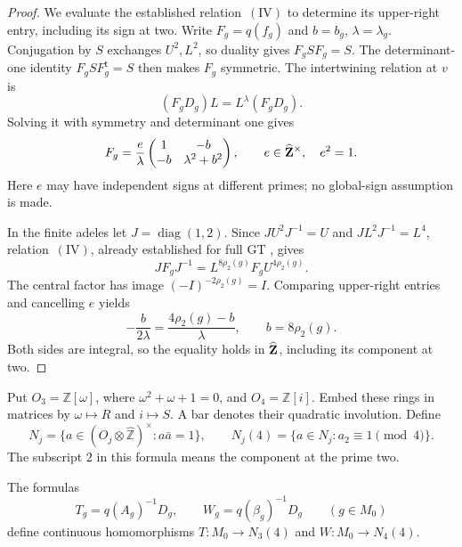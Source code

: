 \begin{proof}
We evaluate the established relation~\((\mathrm{IV})\) to determine
its upper-right entry, including its sign at two. Write
\(F_g=q(f_g)\) and \(b=b_g\), \(\lambda=\lambda_g\).
Conjugation by \(S\) exchanges \(U^2,L^2\), so duality gives
\(F_gSF_g=S\). The determinant-one identity
\(F_gSF_g^{\mathsf t}=S\) then makes \(F_g\) symmetric.
The intertwining relation at \(v\) is
\[
 (F_gD_g)L=L^\lambda(F_gD_g).
\]
Solving it with symmetry and determinant one gives
\[
 F_g=\frac{e}{\lambda}
 \begin{pmatrix}1&-b\\-b&\lambda^2+b^2\end{pmatrix},
 \qquad e\in\widehat{\mathbf Z}^\times,\quad e^2=1.
\]
Here \(e\) may have independent signs at different primes;
no global-sign assumption is made.

In the finite adeles let \(J=\operatorname{diag}(1,2)\).
Since \(JU^2J^{-1}=U\) and \(JL^2J^{-1}=L^4\),
relation~\((\mathrm{IV})\), already established for full GT
\cite[Theorem~1]{H17}, gives
\[
 JF_gJ^{-1}=L^{8\rho_2(g)}F_gU^{4\rho_2(g)}.
\]
The central factor has image
\((-I)^{-2\rho_2(g)}=I\). Comparing upper-right entries and
cancelling \(e\) yields
\[
 -\frac{b}{2\lambda}
       =\frac{4\rho_2(g)-b}{\lambda},
 \qquad b=8\rho_2(g).
\]
Both sides are integral, so the equality holds in
\(\widehat{\mathbf Z}\), including its component at two.
\end{proof}

Put $O_3=\mathbb Z[\omega]$, where $\omega^2+\omega+1=0$,
and $O_4=\mathbb Z[i]$.  Embed these rings in matrices by
$\omega\mapsto R$ and $i\mapsto S$.  A bar denotes their quadratic
involution.  Define
\begin{equation}
 N_j=\{a\in(O_j\otimes\widehat{\mathbb Z})^{\times}:
                                      a\bar a=1\},\qquad
 N_j(4)=\{a\in N_j:a_2\equiv1\pmod4\}.
 \label{eq:adelic-cm-targets}
\end{equation}
The subscript $2$ in this formula means the component at the prime two.

\begin{lemma}\label{lem:adelic-corrected-frames}
The formulas
\begin{equation}
 T_g=q(A_g)^{-1}D_g,\qquad
 W_g=q(\beta_g)^{-1}D_g\qquad(g\in M_0)
 \label{eq:adelic-corrected-frames}
\end{equation}
define continuous homomorphisms
$T:M_0\to N_3(4)$ and $W:M_0\to N_4(4)$.
\end{lemma}

